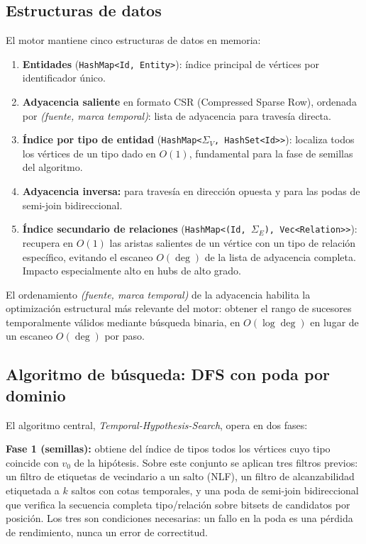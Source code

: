 \documentclass[11pt,a4paper]{article}
\newcommand{\code}[1]{\texttt{#1}}
\begin{document}
\subsection{Estructuras de datos}
El motor mantiene cinco estructuras de datos en memoria:
\begin{enumerate}[leftmargin=*]
  \item \textbf{Entidades} (\code{HashMap<Id, Entity>}): índice principal de
  vértices por identificador único.
  \item \textbf{Adyacencia saliente} en formato CSR (Compressed Sparse Row),
  ordenada por \emph{(fuente, marca temporal)}: lista de adyacencia para
  travesía directa.
  \item \textbf{Índice por tipo de entidad} (\code{HashMap<$\Sigma_V$,
  HashSet<Id>>}): localiza todos los vértices de un tipo dado en $O(1)$,
  fundamental para la fase de semillas del algoritmo.
  \item \textbf{Adyacencia inversa:} para travesía en dirección opuesta y para
  las podas de semi-join bidireccional.
  \item \textbf{Índice secundario de relaciones} (\code{HashMap<(Id,
  $\Sigma_E$), Vec<Relation>>}): recupera en $O(1)$ las aristas salientes de un
  vértice con un tipo de relación específico, evitando el escaneo $O(\deg)$ de
  la lista de adyacencia completa. Impacto especialmente alto en hubs de alto
  grado.
\end{enumerate}

El ordenamiento \emph{(fuente, marca temporal)} de la adyacencia habilita la
optimización estructural más relevante del motor: obtener el rango de sucesores
temporalmente válidos mediante búsqueda binaria, en $O(\log \deg)$ en lugar de
un escaneo $O(\deg)$ por paso.

\subsection{Algoritmo de búsqueda: DFS con poda por dominio}
El algoritmo central, \emph{Temporal-Hypothesis-Search}, opera en dos fases:

\textbf{Fase 1 (semillas):} obtiene del índice de tipos todos los vértices cuyo
tipo coincide con $v_0$ de la hipótesis. Sobre este conjunto se aplican tres
filtros previos: un filtro de etiquetas de vecindario a un salto (NLF), un
filtro de alcanzabilidad etiquetada a $k$ saltos con cotas temporales, y una
poda de semi-join bidireccional que verifica la secuencia completa
tipo/relación sobre bitsets de candidatos por posición. Los tres son
condiciones necesarias: un fallo en la poda es una pérdida de rendimiento,
nunca un error de correctitud.
\end{document}
